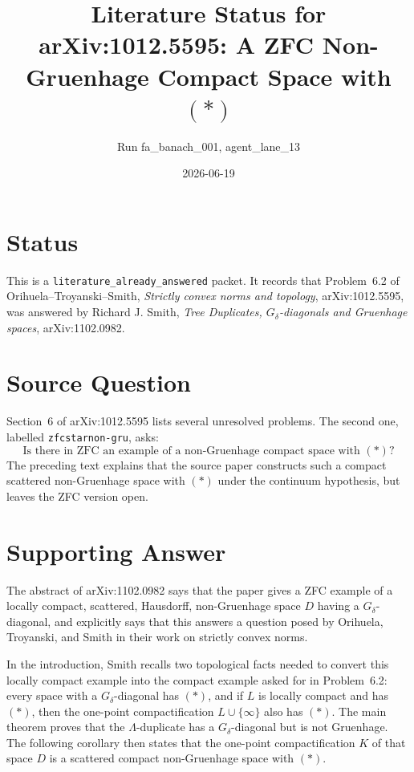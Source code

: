 \documentclass[11pt]{article}
\title{Literature Status for arXiv:1012.5595: A ZFC Non-Gruenhage Compact Space with \((*)\)}
\author{Run fa\_banach\_001, agent\_lane\_13}
\date{2026-06-19}
\begin{document}
\maketitle

\section*{Status}

This is a \texttt{literature\_already\_answered} packet.  It records that
Problem~6.2 of Orihuela--Troyanski--Smith,
\emph{Strictly convex norms and topology}, arXiv:1012.5595, was answered by
Richard J. Smith, \emph{Tree Duplicates, \(G_\delta\)-diagonals and
Gruenhage spaces}, arXiv:1102.0982.

\section*{Source Question}

Section~6 of arXiv:1012.5595 lists several unresolved problems.  The second
one, labelled \texttt{zfcstarnon-gru}, asks:
\[
\text{Is there in ZFC an example of a non-Gruenhage compact space with } (*)?
\]
The preceding text explains that the source paper constructs such a compact
scattered non-Gruenhage space with \((*)\) under the continuum hypothesis, but
leaves the ZFC version open.

\section*{Supporting Answer}

The abstract of arXiv:1102.0982 says that the paper gives a ZFC example of a
locally compact, scattered, Hausdorff, non-Gruenhage space \(D\) having a
\(G_\delta\)-diagonal, and explicitly says that this answers a question posed
by Orihuela, Troyanski, and Smith in their work on strictly convex norms.

In the introduction, Smith recalls two topological facts needed to convert
this locally compact example into the compact example asked for in
Problem~6.2: every space with a \(G_\delta\)-diagonal has \((*)\), and if
\(L\) is locally compact and has \((*)\), then the one-point compactification
\(L\cup\{\infty\}\) also has \((*)\).  The main theorem proves that the
\(\Lambda\)-duplicate has a \(G_\delta\)-diagonal but is not Gruenhage.  The
following corollary then states that the one-point compactification \(K\) of
that space \(D\) is a scattered compact non-Gruenhage space with \((*)\).
\end{document}
